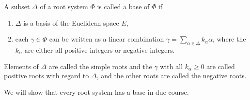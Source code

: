 A subset $\Delta$ of a root system $\Phi$ is called a base
of $\Phi$ if
\begin{enumerate}[label=(\roman*)]
	\item $\Delta$ is a basis of the Euclidean space $E$,
	\item each $\gamma \in \Phi$ can be written as a linear
		combination $\gamma  = \sum_{\alpha \in \Delta} k_{\alpha}\alpha$,
		where the $k_{\alpha}$ are  either all positive integers or
		negative integers.
\end{enumerate}

Elements of $\Delta$ are called the simple roots and the $\gamma$ with all
$k_{\alpha} \geq 0$ are called positive roots with regard to $\Delta$, and
the other roots are called the negative roots.

We will show that every root system has a base in due course.
